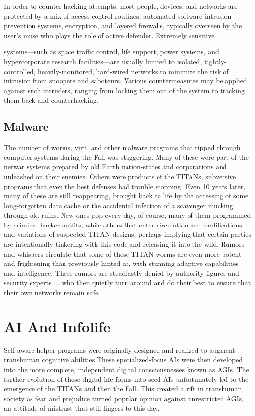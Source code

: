 In order to counter hacking attempts, most people, devices, and networks are protected by a mix of access control routines, automated software intrusion prevention systems, encryption, and layered firewalls, typically overseen by the user's muse who plays the role of active defender. Extremely sensitive 

systems—such as space traffic control, life support, power systems, and hypercorporate research facilities—are usually limited to isolated, tightly-controlled, heavily-monitored, hard-wired networks to minimize the risk of intrusion from snoopers and saboteurs. Various countermeasures may be applied against such intruders, ranging from locking them out of the system to tracking them back and counterhacking. 

\subsection{Malware} 

The number of worms, virii, and other malware programs that ripped through computer systems during the Fall was staggering. Many of these were part of the netwar systems prepared by old Earth nation-states and corporations and unleashed on their enemies. Others were products of the TITANs, subversive programs that even the best defenses had trouble stopping. Even 10 years later, many of these are still reappearing, brought back to life by the accessing of some long-forgotten data cache or the accidental infection of a scavenger mucking through old ruins. New ones pop every day, of course, many of them programmed by criminal hacker outfits, while others that enter circulation are modifications and variations of suspected TITAN designs, perhaps implying that certain parties are intentionally tinkering with this code and releasing it into the wild. Rumors and whispers circulate that some of these TITAN worms are even more potent and frightening than previously hinted at, with stunning adaptive capabilities and intelligence. These rumors are steadfastly denied by authority figures and security experts ... who then quietly turn around and do their best to ensure that their own networks remain safe. 

\section{AI And Infolife} 

Self-aware helper programs were originally designed and realized to augment transhuman cognitive abilities These specialized-focus AIs were then developed into the more complete, independent digital consciousnesses known as AGIs. The further evolution of these digital life forms into seed AIs unfortunately led to the emergence of the TITANs and then the Fall. This created a rift in transhuman society as fear and prejudice turned popular opinion against unrestricted AGIs, an attitude of mistrust that still lingers to this day. 

